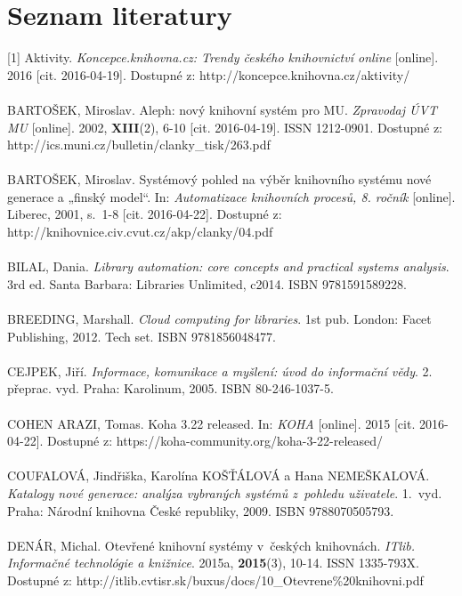\documentclass[
	11pt, oneside, printed, final, palatino, monochrome
	microtype,
	table,   %
	lof,     %
	lot     %
]{fithesis3}
\begin{document}
{\chapter*{Seznam literatury}

[1] Aktivity. \textit{Koncepce.knihovna.cz: Trendy českého knihovnictví online} [online]. 2016 [cit. 2016-04-19]. Dostupné z: http://koncepce.knihovna.cz/aktivity/
~\\ ~\\ \noindent
[2] BARTOŠEK, Miroslav. Aleph: nový knihovní systém pro MU. \textit{Zpravodaj ÚVT MU} [online]. 2002, 	\textbf{XIII}(2), 6-10 [cit. 2016-04-19]. ISSN 1212-0901. Dostupné z: http://ics.muni.cz/bulletin/clanky\_tisk/263.pdf
~\\ ~\\ \noindent
[3] BARTOŠEK, Miroslav. Systémový pohled na výběr knihovního systému nové generace a „finský model“. In: \textit{Automatizace knihovních procesů, 8. ročník} [online]. Liberec, 2001, s.~1-8 [cit. 2016-04-22]. Dostupné z: \\http://knihovnice.civ.cvut.cz/akp/clanky/04.pdf
~\\ ~\\ \noindent
[4] BILAL, Dania. \textit{Library automation: core concepts and practical systems analysis}. 3rd ed. Santa Barbara: Libraries Unlimited, c2014. ISBN 9781591589228.
~\\ ~\\ \noindent
[5] BREEDING, Marshall. \textit{Cloud computing for libraries}. 1st pub. London: Facet Publishing, 2012. Tech set. ISBN 9781856048477.
~\\ ~\\ \noindent
[6] CEJPEK, Jiří. \textit{Informace, komunikace a myšlení: úvod do informační vědy}. 2. přeprac. vyd. Praha: Karolinum, 2005. ISBN 80-246-1037-5.
~\\ ~\\ \noindent
[7] COHEN ARAZI, Tomas. Koha 3.22 released. In: \textit{KOHA} [online]. 2015 [cit. 2016-04-22]. Dostupné z: https://koha-community.org/koha-3-22-released/
~\\ ~\\ \noindent
[8] COUFALOVÁ, Jindřiška, Karolína KOŠŤÁLOVÁ a Hana NEMEŠKALOVÁ. \textit{Katalogy nové generace: analýza vybraných systémů z~pohledu uživatele}. 1.~vyd. Praha: Národní knihovna České republiky, 2009. ISBN 9788070505793.
~\\ ~\\ \noindent
[9] DENÁR, Michal. Otevřené knihovní systémy v~českých knihovnách. \textit{ITlib. Informačné technológie a knižnice}. 2015a, 	\textbf{2015}(3), 10-14. ISSN 1335-793X. \\Dostupné  z: http://itlib.cvtisr.sk/buxus/docs/10\_Otevrene\%20knihovni.pdf
}
\end{document}
